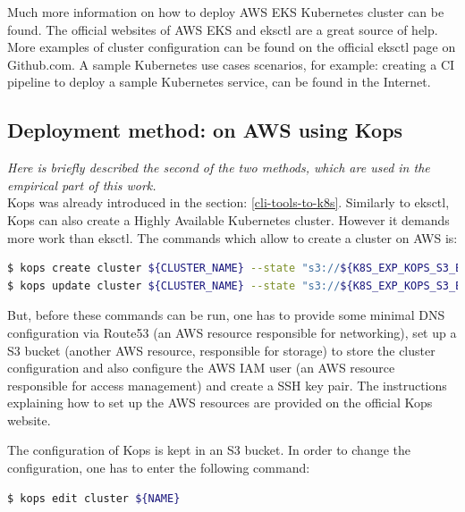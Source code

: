 Much more information on how to deploy AWS EKS Kubernetes cluster can be found. The official websites of AWS EKS\cite{what-is-eks} and eksctl\cite{eksctl} are a great source of help. More examples of cluster configuration can be found on the official eksctl page on Github.com\cite{eks-gh}. A sample Kubernetes use cases scenarios, for example: creating a CI pipeline to deploy a sample Kubernetes service, can be found in the Internet\cite{eksworkshop}.


\subsection{Deployment method: on AWS using Kops}
\textit{Here is briefly described the second of the two methods, which are used in the empirical part of this work.}
\\

Kops was already introduced in the section: \ref{cli-tools-to-k8s}. Similarly to eksctl, Kops can also create a Highly Available Kubernetes cluster. However it demands more work than eksctl. The commands which allow to create a cluster on AWS is\cite{book-mastering-k8s}:
\begin{lstlisting}[basicstyle=\small,caption={The commands of Kops CLI tool used to create a Kubernetes cluster configuration and then to deploy the cluster},captionpos=b,language=Bash,xleftmargin=1cm]
$ kops create cluster ${CLUSTER_NAME} --state "s3://${K8S_EXP_KOPS_S3_BUCKET}" --cloud=aws --zones=us-east-1c
$ kops update cluster ${CLUSTER_NAME} --state "s3://${K8S_EXP_KOPS_S3_BUCKET}" --yes
\end{lstlisting}
But, before these commands can be run, one has to provide some minimal DNS configuration via Route53 (an AWS resource responsible for networking), set up a S3 bucket (another AWS resource, responsible for storage) to store the cluster configuration\cite{book-mastering-k8s} and also configure the AWS IAM user (an AWS resource responsible for access management) and create a SSH key pair\cite{online-kops-aws}. The instructions explaining how to set up the AWS resources are provided on the official Kops website\cite{online-kops-aws}.

The configuration of Kops is kept in an S3 bucket. In order to change the configuration, one has to enter the following command\cite{online-kops-aws}:
\begin{lstlisting}[basicstyle=\small,caption={A command of Kops CLI tool used to edit a Kubernetes cluster configuration},captionpos=b,language=Bash,xleftmargin=1cm]
$ kops edit cluster ${NAME}
\end{lstlisting}

